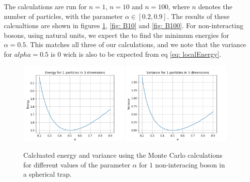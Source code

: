 \documentclass[a4paper, 10pt, english]{revtex4-2} %
\begin{document}
    The calculations are run for $n = 1$, $n = 10$ and $n=100$, where $n$ denotes the number of particles, with the parameter $\alpha \in [0.2, 0.9]$.
    The results of these calcualtions are shown in figures \ref{fig: B1}, \ref{fig: B10} and \ref{fig: B100}.
    For non-interacting bosons, using natural units, we expect the to find the minimum energies for $\alpha = 0.5$.
    This matches all three of our calculations, and we note that the variance for $alpha = 0.5$ is $0$ wich is also to be expected from eq \ref*{eq: localEnergy}.
    \def\imwidth{0.49\textwidth}
    \begin{figure}[!ht]
        \centering
        \includegraphics[width=\imwidth]{figures/Energy_B_1.png}
        \includegraphics[width=\imwidth]{figures/Varience_B_1.png}
        \caption{Calcluated energy and variance using the Monte Carlo calculations for different values of the parameter $\alpha$ for $1$ non-interacing boson in a spherical trap.}
        \label{fig: B1}
    \end{figure}
\end{document}
